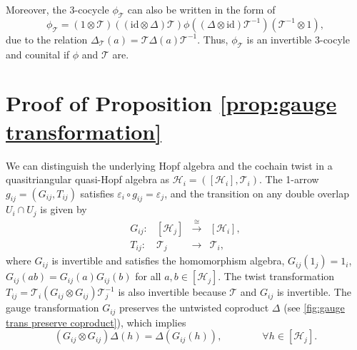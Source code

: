 \documentclass[reqno]{amsart}
\theoremstyle{definition}
\theoremstyle{remark}
\begin{document}
    Moreover, the 3-cocycle $\phi_\mathcal{T}$ can also be written in the form of
    \begin{equation}
        \phi_\mathcal{T} = \left(1\otimes \mathcal{T}\right)\left((\textrm{id}\otimes\Delta) \mathcal{T}\right)\phi \left((\Delta \otimes \textrm{id})\mathcal{T}^{-1}\right)\left(\mathcal{T}^{-1}\otimes 1\right),
    \end{equation}
    due to the relation $\Delta_\mathcal{T}(a)=\mathcal{T}\Delta(a)\mathcal{T}^{-1}$. Thus, $\phi_\mathcal{T}$ is an invertible 3-cocyle and counital if $\phi$ and $\mathcal{T}$ are. 








\section{Proof of Proposition \ref{prop:gauge transformation}}\label{appendix 2}
We can distinguish the underlying Hopf algebra and the cochain twist in a quasitriangular quasi-Hopf algebra as $\mathscr{H}_{i}=\left(\left[\mathscr{H}_i\right],\mathcal{T}_i\right)$. The 1-arrow $g_{ij}=\left(G_{ij},T_{ij}\right)$ satisfies $\varepsilon_i\circ g_{ij}=\varepsilon_j$, and the transition on any double overlap $U_i \cap U_j$ is given by
\begin{equation}
     \begin{array}{rccc}
G_{ij}: & \left[\mathscr{H}_j\right]& \mathop{\longrightarrow}\limits^{\cong}  & \left[\mathscr{H}_i\right], \\
T_{ij} :  & \mathcal{T}_j & \longrightarrow  & \mathcal{T}_i,
\end{array}
\end{equation}
where $G_{ij}$ is invertible and satisfies the homomorphism algebra, $G_{ij}(1_j)=1_i$, $G_{ij}(ab)=G_{ij}(a)G_{ij}(b)$ for all $a,b\in \left[\mathscr{H}_j\right]$. The twist transformation $T_{ij}=\mathcal{T}_i \left(G_{ij}\otimes G_{ij}\right)\mathcal{T}_j^{-1}$ is also invertible because $\mathcal{T}$ and $G_{ij}$ is invertible. The gauge transformation $G_{ij}$ preserves the untwisted coproduct $\Delta$ (see \cref{fig:gauge trans preserve coproduct}), which implies
\begin{equation}\label{eq:gauge trans preserve coproduct}
    \left(G_{ij}\otimes G_{ij}\right)\Delta(h) = \Delta\left(G_{ij}(h)\right), \qquad \qquad \forall h \in \left[\mathscr{H}_j\right].
\end{equation}
\end{document}
